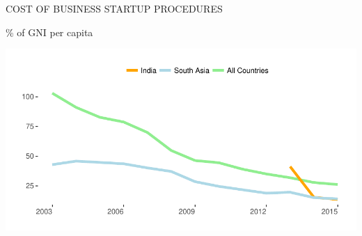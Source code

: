 \documentclass{article}\usepackage[]{graphicx}\usepackage[]{color}
\makeatletter
\def\maxwidth{ %
  \ifdim\Gin@nat@width>\linewidth
    \linewidth
  \else
    \Gin@nat@width
  \fi
}
\makeatother
\begin{document}
\begin{minipage}[b]{0.95\textwidth}
  \vspace{0.8cm}
  \begin{minipage}[c]{0.43\textwidth} 
    \hspace{4ex}\small{\textcolor[HTML]{818181}{COST OF BUSINESS STARTUP PROCEDURES}}
    
    \hspace{4ex}\footnotesize{\textcolor[HTML]{818181}{\% of GNI per capita}}


\hfill{}\includegraphics[width=\maxwidth]{figure/line_chart_Policy-1} 




\end{minipage}
\end{minipage}
\end{document}
